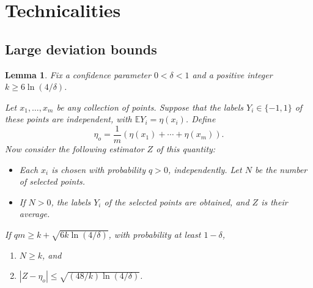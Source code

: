 \documentclass{article}
\def\E{{\mathbb E}}
\newtheorem{lemma}[thm]{Lemma}
\begin{document}
\pagebreak

\section{Technicalities}

\subsection{Large deviation bounds}

\begin{lemma}
Fix a confidence parameter $0 < \delta < 1$ and a positive integer $k \geq 6 \ln (4/\delta)$. 

Let $x_1, \ldots, x_m$ be any collection of points. Suppose that the labels $Y_i \in \{-1,1\}$ of these points are independent, with $\E Y_i = \eta(x_i)$. Define
$$ \eta_o = \frac{1}{m} \left( \eta(x_1) + \cdots + \eta(x_m) \right) .$$
Now consider the following estimator $Z$ of this quantity:
\begin{itemize}
\item Each $x_i$ is chosen with probability $q > 0$, independently. Let $N$ be the number of selected points.
\item If $N > 0$, the labels $Y_i$ of the selected points are obtained, and $Z$ is their average.
\end{itemize}
If $qm \geq k + \sqrt{6k \ln (4/\delta)}$, with probability at least $1-\delta$, 
\begin{enumerate}
\item[(a)] $N \geq k$, and 
\item[(b)] $| Z - \eta_o| \leq \sqrt{(48/k) \ln (4/\delta)}$.
\end{enumerate}
\label{lemma:large-deviation-discrete}
\end{lemma}
\end{document}
